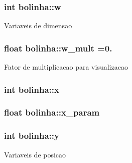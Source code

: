 \subsubsection[{\texorpdfstring{w}{w}}]{\setlength{\rightskip}{0pt plus 5cm}int bolinha\+::w\hspace{0.3cm}{\ttfamily [private]}}\hypertarget{classbolinha_a4136d7cb978a3190073e1544fb336876}{}\label{classbolinha_a4136d7cb978a3190073e1544fb336876}
Variaveis de dimensao 
\subsubsection[{\texorpdfstring{w\+\_\+mult}{w_mult}}]{\setlength{\rightskip}{0pt plus 5cm}float bolinha\+::w\+\_\+mult =0.\hspace{0.3cm}{\ttfamily [private]}}\hypertarget{classbolinha_a91dd1f60f5312cf476e02e5396c2f871}{}\label{classbolinha_a91dd1f60f5312cf476e02e5396c2f871}
Fator de multiplicacao para visualizacao 
\subsubsection[{\texorpdfstring{x}{x}}]{\setlength{\rightskip}{0pt plus 5cm}int bolinha\+::x\hspace{0.3cm}{\ttfamily [private]}}\hypertarget{classbolinha_ad6918f0b95a774318e4ceb7c3f9720de}{}\label{classbolinha_ad6918f0b95a774318e4ceb7c3f9720de}
\subsubsection[{\texorpdfstring{x\+\_\+param}{x_param}}]{\setlength{\rightskip}{0pt plus 5cm}float bolinha\+::x\+\_\+param\hspace{0.3cm}{\ttfamily [private]}}\hypertarget{classbolinha_ac9d2238772d85a88f57602ff7bfd8387}{}\label{classbolinha_ac9d2238772d85a88f57602ff7bfd8387}
\subsubsection[{\texorpdfstring{y}{y}}]{\setlength{\rightskip}{0pt plus 5cm}int bolinha\+::y\hspace{0.3cm}{\ttfamily [private]}}\hypertarget{classbolinha_a1ef5bc9948639dc0065e17a8e6b88846}{}\label{classbolinha_a1ef5bc9948639dc0065e17a8e6b88846}
Variaveis de posicao 
